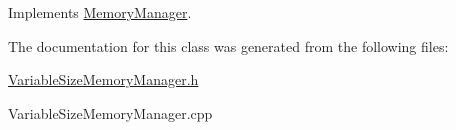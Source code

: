 Implements \hyperlink{classMemoryManager_a53a7f4663f763985ce93f36d76d08370}{MemoryManager}.



The documentation for this class was generated from the following files:\begin{DoxyCompactItemize}
\item 
\hyperlink{VariableSizeMemoryManager_8h}{VariableSizeMemoryManager.h}\item 
VariableSizeMemoryManager.cpp\end{DoxyCompactItemize}
